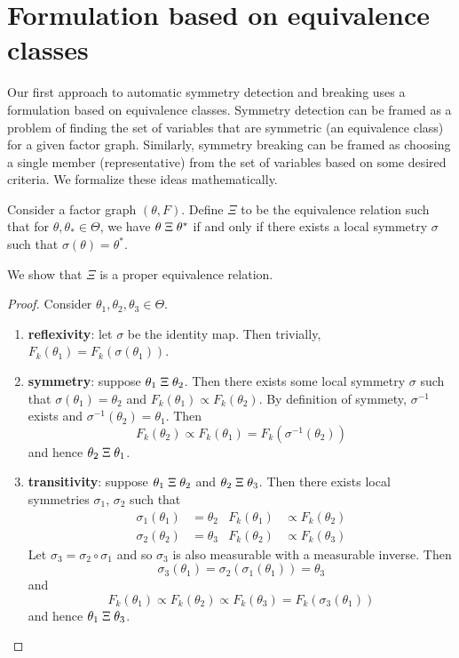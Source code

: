 

\section{Formulation based on equivalence classes}

Our first approach to automatic symmetry detection and breaking uses a formulation based on equivalence classes. Symmetry detection can be framed as a problem of finding the set of variables that are symmetric (an equivalence class) for a given factor graph. Similarly, symmetry breaking can be framed as choosing a single member (representative) from the set of variables based on some desired criteria. We formalize these ideas mathematically.

\begin{defn}
Consider a factor graph $(\theta,F)$. Define $\Xi$ to be the equivalence relation such that for $\theta,\theta_*\in\Theta$, we have $\theta\;\Xi\;\theta^*$ if and only if there exists a local symmetry $\sigma$ such that $\sigma(\theta)=\theta^*$.
\end{defn}

\noindent We show that $\Xi$ is a proper equivalence relation.

\begin{proof}
Consider $\theta_1, \theta_2, \theta_3\in\Theta$.
\begin{enumerate}

\item
\textbf{reflexivity}: let $\sigma$ be the identity map. Then trivially, $F_k(\theta_1) = F_k(\sigma(\theta_1))$.

\item
\textbf{symmetry}: suppose $\theta_1\;\Xi\;\theta_2$. Then there exists some local symmetry $\sigma$ such that $\sigma(\theta_1)=\theta_2$ and $F_k(\theta_1) \propto F_k(\theta_2)$. By definition of symmety, $\sigma^{-1}$ exists and $\sigma^{-1}(\theta_2)=\theta_1$. Then
\[
F_k(\theta_2) \propto F_k(\theta_1) = F_k(\sigma^{-1}(\theta_2))
\]
and hence $\theta_2\;\Xi\;\theta_1$.

\item
\textbf{transitivity}: suppose $\theta_1\;\Xi\;\theta_2$ and $\theta_2\;\Xi\;\theta_3$. Then there exists local symmetries $\sigma_1$, $\sigma_2$ such that
\begin{align*}
\sigma_1(\theta_1)&=\theta_2 & F_k(\theta_1)&\propto F_k(\theta_2) \\
\sigma_2(\theta_2)&=\theta_3 & F_k(\theta_2)&\propto F_k(\theta_3)
\end{align*}
Let $\sigma_3=\sigma_2\circ\sigma_1$ and so $\sigma_3$ is also measurable with a measurable inverse. Then
\[
\sigma_3(\theta_1)=\sigma_2(\sigma_1(\theta_1)) = \theta_3
\]
and
\[
F_k(\theta_1) \propto F_k(\theta_2) \propto F_k(\theta_3) = F_k(\sigma_3(\theta_1))
\]
and hence $\theta_1\;\Xi\;\theta_3$.

\end{enumerate}
\end{proof}

